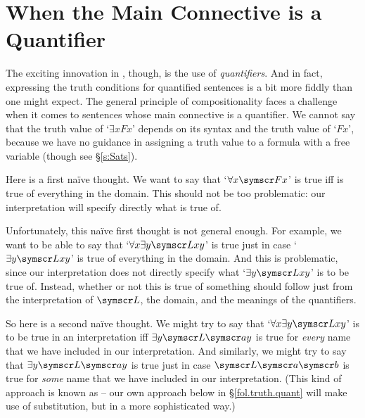 \section{When the Main Connective is a Quantifier}

The exciting innovation in \FOL, though, is the use of \emph{quantifiers}. And in fact, expressing the truth conditions for quantified sentences is a bit more fiddly than one might expect. The general principle of compositionality faces a challenge when it comes to sentences whose main connective is a quantifier. We cannot say that the truth value of `$\exists x Fx$' depends on its syntax and the truth value of `$Fx$', because we have no guidance in assigning a truth value to a formula with a free variable (though see §\ref{s:Sats}).

Here is a first naïve thought. We want to say that `$\forall x \meta{F}x$' is true iff  is true of everything in the domain. This should not be too problematic: our interpretation will specify directly what  is true of. 

Unfortunately, this naïve first thought is not general enough. For example, we want to be able to say that `$\forall x \exists y \meta{L}xy$' is true just in case `$\exists y \meta{L}xy$' is true of everything in the domain. And this is problematic, since our interpretation does not directly specify what `$\exists y \meta{L}xy$' is to be true of. Instead, whether or not this is true of something should follow just from the interpretation of $\meta{L}$, the domain, and the meanings of the quantifiers. 

So here is a second naïve thought. We might try to say that `$\forall x \exists y \meta{L}xy$' is to be true in an interpretation iff $\exists y \meta{L}\meta{a}y$ is true for \emph{every} name  that we have included in our interpretation. And similarly, we might try to say that $\exists y \meta{L}\meta{a}y$ is true just in case $\meta{L}\meta{a}\meta{b}$ is true for \emph{some} name  that we have included in our interpretation. (This kind of approach is known as  – our own approach below in §\ref{fol.truth.quant} will make use of substitution, but in a more sophisticated way.)

